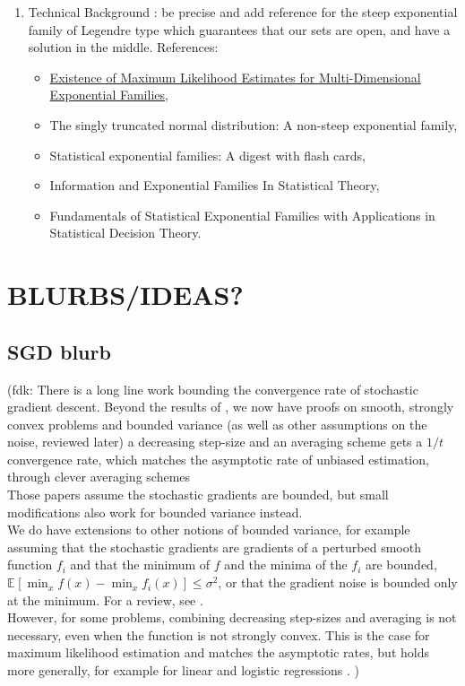 \documentclass[twoside]{article}
\let\oldsection\section
\renewcommand{\section}[1]{\oldsection{\texorpdfstring{\uppercase{#1}}{#1}}}
\newcommand{\fdk}[1]{\textcolor{Periwinkle}{(fdk:#1)}}
\newcommand*{\expect}[2][]{\ensuremath{\mathbb{E}_{#1} \left[ #2 \right] }} %
\begin{document}
\begin{enumerate}
	\item Technical Background : be precise and add reference for the steep exponential family of Legendre type which guarantees that our sets are open, and have a solution in the middle.
	References: \begin{itemize}
		\item \href{https://www.jstor.org/stable/4616462?seq=1#metadata_info_tab_contents}{Existence of Maximum Likelihood Estimates for Multi-Dimensional Exponential Families},
		\item The singly truncated normal distribution: A non-steep exponential family,
		\item Statistical exponential families: A digest with flash cards,
		\item Information and Exponential Families In Statistical Theory,
		\item Fundamentals of Statistical Exponential Families with Applications in Statistical Decision Theory.
	\end{itemize}
\end{enumerate}




\section{Blurbs/ideas?}



\subsection{SGD blurb}
\fdk{
%
There is a long line work bounding the convergence rate of stochastic gradient descent.
Beyond the results of \citet{robbins1951stochastic},
we now have proofs on smooth, strongly convex problems and bounded variance
(as well as other assumptions on the noise, reviewed later)
a decreasing step-size and an averaging scheme gets
a $1/t$ convergence rate,
which matches the asymptotic rate of unbiased estimation,
through clever averaging schemes \citep{rakhlin2012making,lacostejulien2012simpler}
\\
Those papers assume the stochastic gradients are bounded,
but small modifications also work for bounded variance instead.
\\
We do have extensions to other notions of bounded variance,
for example assuming that the stochastic gradients are gradients of a perturbed smooth function $f_i$
and that the minimum of $f$ and the minima of the $f_i$
are bounded, $\expect{\min_x f(x) - \min_x f_i(x)} \leq \sigma^2$,
or that the gradient noise is bounded only at the minimum.
For a review, see \citet{gower2019sgd}.
\\
However, for some problems, combining decreasing step-sizes and averaging is not necessary,
even when the function is not strongly convex.
This is the case for maximum likelihood estimation and matches the asymptotic rates,
but holds more generally, for example for linear and logistic regressions \citep{bach2013nonstronglyconvex,moulines2011non}.
}
\end{document}
